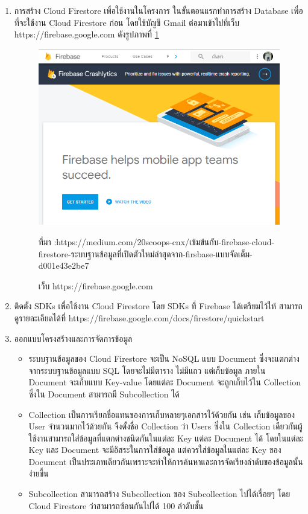 \begin{enumerate}[label=\arabic*)]
	\item การสร้าง Cloud Firestore เพื่อใช้งานในโครงการ ในขั้นตอนแรกทำการสร้าง Database เพื่อที่จะใช้งาน Cloud Firestore ก่อน โดยใช้บัญชี Gmail ต่อมาเข้าไปที่เว็บ https://firebase.google.com  ดังรูปภาพที่ \ref{Fig:f1}
	\begin{figure}[H]
		\centering
		\includegraphics[width=0.7\columnwidth]{Figures/2/f1}
		\caption{เว็บ https://firebase.google.com}{ที่มา :https://medium.com/20scoops-cnx/เข้มข้นกับ-firebase-cloud-firestore-ระบบฐานข้อมูลที่เปิดตัวใหม่ล่าสุดจาก-firsbase-แบบจัดเต็ม-d001e43e2be7 }
		\label{Fig:f1}
	\end{figure}
	\item ติดตั้ง SDKs เพื่อใช้งาน Cloud Firestore
	โดย SDKs ที่ Firebase ได้เตรียมไว้ให้ สามารถดูรายละเอียดได้ที่ https://firebase.google.com/docs/firestore/quickstart
	\item ออกแบบโครงสร้างและการจัดการข้อมูล  
	\begin{itemize}
		\item ระบบฐานข้อมูลของ Cloud Firestore จะเป็น NoSQL แบบ Document ซึ่งจะแตกต่างจากระบบฐานข้อมูลแบบ SQL โดยจะไม่มีตาราง ไม่มีแถว แต่เก็บข้อมูล ภายใน Document จะเก็บแบบ Key-value โดยแต่ละ Document จะถูกเก็บไว้ใน Collection ซึ่งใน Document สามารถมี Subcollection ได้
		\item Collection เป็นการเรียกชื่อแทนของการเก็บหลายๆเอกสารไว้ด้วยกัน เช่น เก็บข้อมูลของ User จำนวนมากไว้ด้วยกัน จึงตั้งชื่อ Collection ว่า Users ซึ่งใน Collection เดียวกันผู้ใช้งานสามารถใส่ข้อมูลที่แตกต่างชนิดกันในแต่ละ Key แต่ละ Document ได้ โดยในแต่ละ Key และ Document จะมีอิสระในการใส่ข้อมูล แต่ควรใส่ข้อมูลในแต่ละ Key ของ Document เป็นประเภทเดียวกันเพราะจะทำให้การค้นหาและการจัดเรียงลำดับของข้อมูลนั้นง่ายขึ้น
		\item Subcollection สามารถสร้าง Subcollection ของ Subcollection ไปได้เรื่อยๆ โดย Cloud Firestore ว่าสามารถซ้อนกันไปได้ 100 ลำดับชั้น

\end{itemize}
\end{enumerate}
